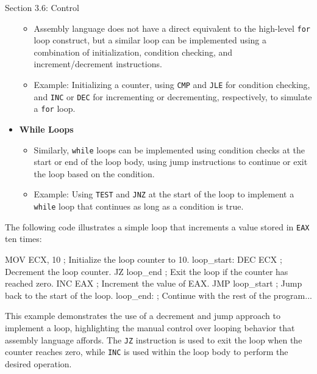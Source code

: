 \begin{notes}{Section 3.6: Control}
\begin{itemize}
\begin{itemize}
            \item Assembly language does not have a direct equivalent to the high-level \texttt{for} loop construct, but a similar loop can be implemented using a combination of initialization, condition 
            checking, and increment/decrement instructions.
            \item Example: Initializing a counter, using \texttt{CMP} and \texttt{JLE} for condition checking, and \texttt{INC} or \texttt{DEC} for incrementing or decrementing, respectively, to simulate 
            a \texttt{for} loop.
        \end{itemize}
        \item \textbf{While Loops}
        \begin{itemize}
            \item Similarly, \texttt{while} loops can be implemented using condition checks at the start or end of the loop body, using jump instructions to continue or exit the loop based on the condition.
            \item Example: Using \texttt{TEST} and \texttt{JNZ} at the start of the loop to implement a \texttt{while} loop that continues as long as a condition is true.
        \end{itemize}
    \end{itemize}
    
    \begin{highlight}
        The following code illustrates a simple loop that increments a value stored in \texttt{EAX} ten times:
    
    \begin{code}[Assembly]
    MOV ECX, 10                 ; Initialize the loop counter to 10.
    loop_start:
        DEC ECX                 ; Decrement the loop counter.
        JZ loop_end             ; Exit the loop if the counter has reached zero.
        INC EAX                 ; Increment the value of EAX.
        JMP loop_start          ; Jump back to the start of the loop.
    loop_end:
        ; Continue with the rest of the program...
    \end{code}
    
        This example demonstrates the use of a decrement and jump approach to implement a loop, highlighting the manual control over looping behavior that assembly language affords. The \texttt{JZ} 
        instruction is used to exit the loop when the counter reaches zero, while \texttt{INC} is used within the loop body to perform the desired operation.
    \end{highlight}


\end{notes}
